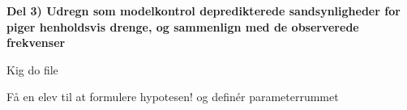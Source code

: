 \textbf{Del 3) Udregn som modelkontrol depredikterede sandsynligheder for piger henholdsvis drenge, og sammenlign med de observerede frekvenser}

Kig do file

\iffalse

\textbf{Formuler ideen om at drenge har en fraværs-sandsynlighed hver uge som er 10 procent point højere end piger som en statistisk hypotese}

\begin{equation}
    H_0 : \beta_2 = 0.1 \qquad H_A : \beta_2 \neq A
\end{equation}

Opskriver parameterrummet:

\begin{equation}
    \Theta_0 = \{: \R\} \qquad \Theta_A = \{ : \R\}
\end{equation}

\fi

Få en elev til at formulere hypotesen! og definér parameterrummet



